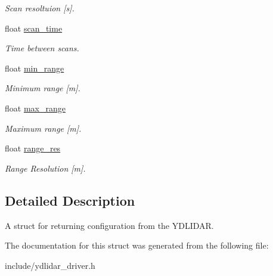 \begin{DoxyCompactItemize}
\begin{DoxyCompactList}\small\item\em Scan resoltuion \mbox{[}s\mbox{]}. \end{DoxyCompactList}\item 
float \hyperlink{struct_laser_config_af40c5e3902bb931e337ea400682e5636}{scan\+\_\+time}\hypertarget{struct_laser_config_af40c5e3902bb931e337ea400682e5636}{}\label{struct_laser_config_af40c5e3902bb931e337ea400682e5636}

\begin{DoxyCompactList}\small\item\em Time between scans. \end{DoxyCompactList}\item 
float \hyperlink{struct_laser_config_a262652da08f505f112be9e017fb43a43}{min\+\_\+range}\hypertarget{struct_laser_config_a262652da08f505f112be9e017fb43a43}{}\label{struct_laser_config_a262652da08f505f112be9e017fb43a43}

\begin{DoxyCompactList}\small\item\em Minimum range \mbox{[}m\mbox{]}. \end{DoxyCompactList}\item 
float \hyperlink{struct_laser_config_a977dcea9a68dc9dd21113fd0eff24c9c}{max\+\_\+range}\hypertarget{struct_laser_config_a977dcea9a68dc9dd21113fd0eff24c9c}{}\label{struct_laser_config_a977dcea9a68dc9dd21113fd0eff24c9c}

\begin{DoxyCompactList}\small\item\em Maximum range \mbox{[}m\mbox{]}. \end{DoxyCompactList}\item 
float \hyperlink{struct_laser_config_ae52eb0e0aca41f6dde58700a642e4c80}{range\+\_\+res}\hypertarget{struct_laser_config_ae52eb0e0aca41f6dde58700a642e4c80}{}\label{struct_laser_config_ae52eb0e0aca41f6dde58700a642e4c80}

\begin{DoxyCompactList}\small\item\em Range Resolution \mbox{[}m\mbox{]}. \end{DoxyCompactList}\end{DoxyCompactItemize}


\subsection{Detailed Description}
A struct for returning configuration from the Y\+D\+L\+I\+D\+AR. 

The documentation for this struct was generated from the following file\+:\begin{DoxyCompactItemize}
\item 
include/ydlidar\+\_\+driver.\+h\end{DoxyCompactItemize}
